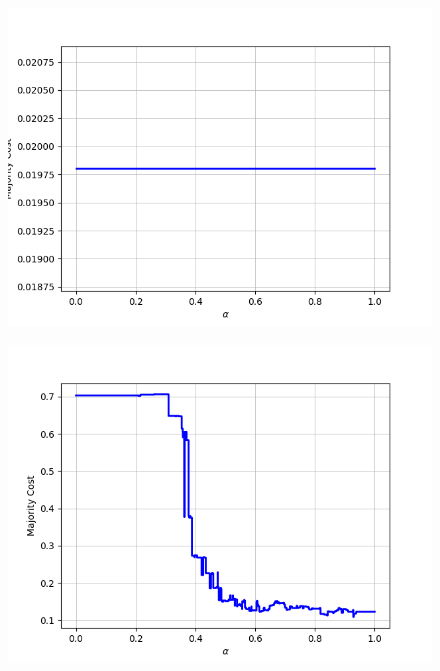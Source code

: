 \begin{figure}[h]
\begin{minipage}{.24\textwidth}
  {\includegraphics[width=\linewidth]{plots/nell-sc/invertebrate}}
\end{minipage}
\begin{minipage}{.24\textwidth}
  \centering
  {\includegraphics[width=\linewidth]{plots/nell-sc/location}}
\end{minipage}
\begin{minipage}{.24\textwidth}
  \centering

\end{minipage}
\end{figure}
